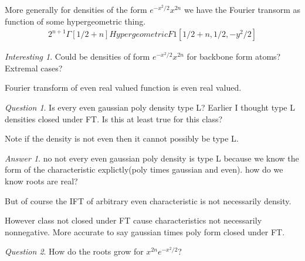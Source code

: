 \documentclass[11pt]{article}
\theoremstyle{remark}
\newtheorem*{quest}{Question}
\newtheorem*{ans}{Answer}
\newtheorem*{interest}{Interesting}
\begin{document}
\begin{remark}
	More generally for densities of the form $e^{-x^2/2}x^{2n}$ we have the Fourier transorm as function of some hypergeometric thing.
	\begin{align*}
		2^{n+1}\Gamma[1/2+n]HypergeometricF1[1/2+n,1/2,-y^2/2]
	\end{align*} 
\end{remark}

\begin{interest}
	Could be densities of form $e^{-x^2/2}x^{2n}$ for backbone form atoms? Extremal cases?
\end{interest}

\begin{remark}
	Fourier transform of even real valued function is even real valued.
\end{remark}

\begin{quest}
	Is every even gaussian poly density type L? Earlier I thought type L densities closed under FT. Is this at least true for this class?

	Note if the density is not even then it cannot possibly be type L. 
\end{quest}

\begin{ans}
	no not every even gaussian poly density is type L because we know the form of the characteristic explictly(poly times gaussian and even).  how do we know roots are real? 

	But of course the IFT of arbitrary even characteristic is not necessarily density.

	However class not closed under FT cause characteristics not necessarily nonnegative. More accurate to say gaussian times poly form closed under FT.
\end{ans}

\begin{quest}
	How do the roots grow for $x^{2n}e^{-x^2/2}$?
\end{quest}
\end{document}
